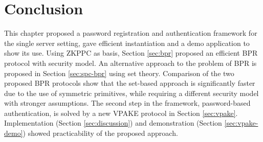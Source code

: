 


\section{Conclusion} \label{sec:vpake-conclusion}
This chapter proposed a password registration and authentication framework for the single server setting, gave efficient instantiation and a demo application to show its use.
Using \ac{ZKPPC} as basis, Section \ref{sec:bpr} proposed an efficient \acl{BPR} protocol with security model.
An alternative approach to the problem of \ac{BPR} is proposed in Section \ref{sec:spc-bpr} using set theory.
Comparison of the two proposed \ac{BPR} protocols show that the set-based approach is significantly faster due to the use of symmetric primitives, while requiring a different security model with stronger assumptions.
The second step in the framework, password-based authentication, is solved by a new \ac{VPAKE} protocol in Section \ref{sec:vpake}.
Implementation (Section \ref{sec:discussion}) and demonstration (Section \ref{sec:vpake-demo}) showed practicability of the proposed approach.

